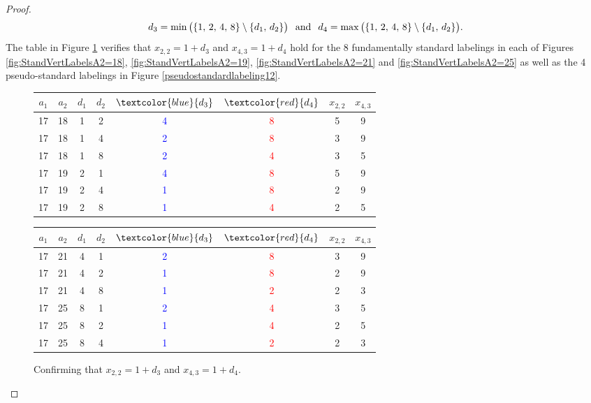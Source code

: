 \documentclass[10pt, reqno]{amsart}
\theoremstyle{definition}
\theoremstyle{plain}
\begin{document}
\begin{proof}
\begin{equation*}
  d_3= \min\big(\{ 1,\, 2,\, 4,\, 8\}\setminus \{d_1,\, d_2\}\big)\hspace{.1in}\text{and}\hspace{.1in}d_4= \max\big(\{ 1,\, 2,\, 4,\, 8\}\setminus \{d_1,\, d_2\}\big).   
\end{equation*}
The table in Figure \ref{confirmd_3v}  verifies that $x_{2,2}=1+d_3$ and $x_{4,3}=1+d_4$ hold for the 8 fundamentally standard labelings 
in each of Figures \ref{fig:StandVertLabelsA2=18}, \ref{fig:StandVertLabelsA2=19}, \ref{fig:StandVertLabelsA2=21} and 
\ref{fig:StandVertLabelsA2=25} as well as the 4 pseudo-standard labelings in Figure \ref{pseudostandardlabeling12}. 


\begin{figure}[hbt!]
\centering
\renewcommand{\arraystretch}{1.5}
\begin{tabular}{|c|c|c|c|c|c|c|c|} \hline
  $a_1$ & $a_2$  & $d_1$ & $d_2$ & $\textcolor{blue}{d_3}$ & $\textcolor{red}{d_4}$ & $x_{2,2}$  & $x_{4,3}$\\  \hline
    17  &  18  & 1 & 2 & \textcolor{blue}{4} & \textcolor{red}{8} & 5  & 9 \\  \hline
     17 &  18  &  1 & 4 & \textcolor{blue}{2} & \textcolor{red}{8} & 3 & 9 \\  \hline
     17 &    18  & 1 & 8 & \textcolor{blue}{2} & \textcolor{red}{4} & 3 & 5  \\  \hline
     17  &  19  & 2 & 1 & \textcolor{blue}{4} & \textcolor{red}{8} & 5  & 9 \\  \hline
     17 &  19  &  2 & 4 & \textcolor{blue}{1} & \textcolor{red}{8} & 2 & 9 \\  \hline
     17 &    19  & 2 & 8 & \textcolor{blue}{1} & \textcolor{red}{4} & 2 & 5  \\  \hline
    \end{tabular}\hspace{0.15in}
\begin{tabular}{|c|c|c|c|c|c|c|c|} \hline
  $a_1$ & $a_2$  & $d_1$ & $d_2$ & $\textcolor{blue}{d_3}$ & $\textcolor{red}{d_4}$ & $x_{2,2}$  & $x_{4,3}$\\  \hline
    17  &  21  & 4 & 1 & \textcolor{blue}{2} & \textcolor{red}{8} & 3  & 9 \\  \hline
     17 &  21  &  4 & 2 & \textcolor{blue}{1} & \textcolor{red}{8} & 2 & 9 \\  \hline
     17 &   21  & 4 & 8 & \textcolor{blue}{1} & \textcolor{red}{2} & 2 & 3  \\  \hline
     17  &  25  & 8 & 1 & \textcolor{blue}{2} & \textcolor{red}{4} & 3  & 5 \\  \hline
     17 &  25  &  8 & 2 & \textcolor{blue}{1} & \textcolor{red}{4} & 2 & 5 \\  \hline
     17 &    25  & 8 & 4 & \textcolor{blue}{1} & \textcolor{red}{2} & 2 & 3  \\  \hline
    \end{tabular}
\caption{Confirming that $x_{2,2}=1+d_3$ and $x_{4,3}=1+d_4$.}\label{confirmd_3v}    
\end{figure}


\end{proof}
\end{document}
